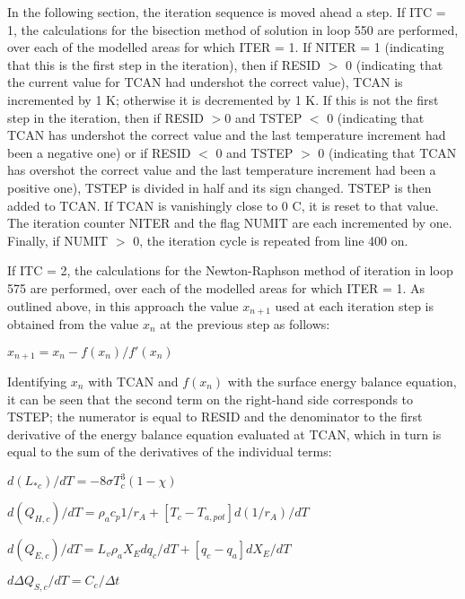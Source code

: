 In the following section, the iteration sequence is moved ahead a step. If I\+T\+C = 1, the calculations for the bisection method of solution in loop 550 are performed, over each of the modelled areas for which I\+T\+E\+R = 1. If N\+I\+T\+E\+R = 1 (indicating that this is the first step in the iteration), then if R\+E\+S\+I\+D $>$ 0 (indicating that the current value for T\+C\+A\+N had undershot the correct value), T\+C\+A\+N is incremented by 1 K; otherwise it is decremented by 1 K. If this is not the first step in the iteration, then if R\+E\+S\+I\+D $>$0 and T\+S\+T\+E\+P $<$ 0 (indicating that T\+C\+A\+N has undershot the correct value and the last temperature increment had been a negative one) or if R\+E\+S\+I\+D $<$ 0 and T\+S\+T\+E\+P $>$ 0 (indicating that T\+C\+A\+N has overshot the correct value and the last temperature increment had been a positive one), T\+S\+T\+E\+P is divided in half and its sign changed. T\+S\+T\+E\+P is then added to T\+C\+A\+N. If T\+C\+A\+N is vanishingly close to 0 C, it is reset to that value. The iteration counter N\+I\+T\+E\+R and the flag N\+U\+M\+I\+T are each incremented by one. Finally, if N\+U\+M\+I\+T $>$ 0, the iteration cycle is repeated from line 400 on.

If I\+T\+C = 2, the calculations for the Newton-\/\+Raphson method of iteration in loop 575 are performed, over each of the modelled areas for which I\+T\+E\+R = 1. As outlined above, in this approach the value $x_{n+1}$ used at each iteration step is obtained from the value $x_n$ at the previous step as follows\+:

$x_{n+1} = x_n - f(x_n )/f'(x_n )$

Identifying $x_n$ with T\+C\+A\+N and $f(x_n )$ with the surface energy balance equation, it can be seen that the second term on the right-\/hand side corresponds to T\+S\+T\+E\+P; the numerator is equal to R\+E\+S\+I\+D and the denominator to the first derivative of the energy balance equation evaluated at T\+C\+A\+N, which in turn is equal to the sum of the derivatives of the individual terms\+:

$d(L_{*c} )/dT = -8 \sigma T_c^3 (1 - \chi)$

$d(Q_{H,c} )/dT = \rho_a c_p {1/r_A + [T_c - T_{a,pot} ] d(1/r_A )/dT}$

$d(Q_{E,c} )/dT = L_v \rho_a {X_E dq_c /dT + [q_c - q_a ] dX_E /dT}$

$d \Delta Q_{S,c} /dT = C_c / \Delta t$

